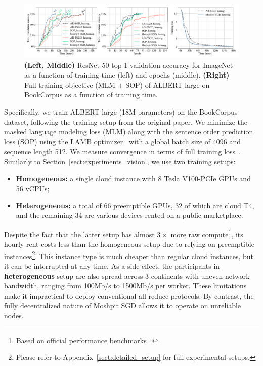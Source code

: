 \begin{figure}[t]
    \noindent
    \centering
    \vspace{-10pt}
    \includegraphics[width=\textwidth]{resources/albert_hours.pdf}
    \vspace{-16pt}
    \caption{\textbf{(Left, Middle)} ResNet-50 top-1 validation accuracy for ImageNet as a function of training time (left) and epochs (middle). \textbf{(Right)} Full training objective (MLM + SOP) of ALBERT-large on BookCorpus as a function of training time.}
    \label{fig:all}\vspace{-6pt}
\end{figure}


Specifically, we train ALBERT-large (18M parameters) on the BookCorpus~\cite{bookcorpus} dataset, following the training setup from the original paper. We minimize the masked language modeling loss (MLM) along with the sentence order prediction loss (SOP) using the LAMB optimizer~\cite{You2020Large} with a global batch size of 4096 and sequence length 512. We measure convergence in terms of full training loss~\cite{lin2020multinode,fedus2021switch}. Similarly to Section~\ref{sect:experiments_vision}, we use two training setups:
\vspace{-4pt}\begin{itemize}[leftmargin=*]
    \item \textbf{Homogeneous:} a single cloud instance with $8$ Tesla V100-PCIe GPUs and 56 vCPUs;
    \item \textbf{Heterogeneous:} a total of 66 preemptible GPUs, 32 of which are cloud T4, and the remaining 34 are various devices rented on a public marketplace.
\end{itemize}\vspace{-4pt}

Despite the fact that the latter setup has almost $3{\times}$ more raw compute\footnote{Based on official performance benchmarks~\cite{nvidia_perf}.}, its hourly rent costs less than the homogeneous setup due to relying on preemptible instances\footnote{Please refer to Appendix~\ref{sect:detailed_setup} for full experimental setups.}. This instance type is much cheaper than regular cloud instances, but it can be interrupted at any time. As a side-effect, the participants in \textbf{heterogeneous} setup are also spread across 3 continents with uneven network bandwidth, ranging from 100Mb/s to 1500Mb/s per worker. These limitations make it impractical to deploy conventional all-reduce protocols. By contrast, the fully decentralized nature of Moshpit SGD allows it to operate on unreliable nodes.

